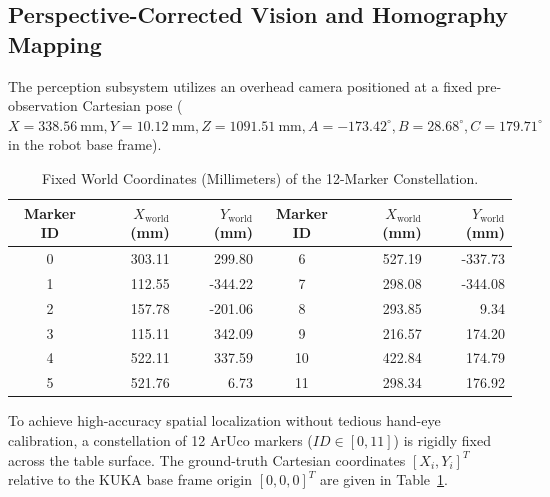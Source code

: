 \documentclass[runningheads]{llncs}
\begin{document}
\subsection{Perspective-Corrected Vision and Homography Mapping}
The perception subsystem utilizes an overhead camera positioned at a fixed pre-observation Cartesian pose ($X = \SI{338.56}{\milli\meter}, Y = \SI{10.12}{\milli\meter}, Z = \SI{1091.51}{\milli\meter}, A = -173.42^\circ, B = 28.68^\circ, C = 179.71^\circ$ in the robot base frame). 

\begin{table}[tb]
\caption{Fixed World Coordinates (Millimeters) of the 12-Marker Constellation.}
\label{tab:aruco_coords}
\centering
\begin{tabular}{crr|crr}
\toprule
\textbf{Marker ID} & \textbf{$X_{\text{world}}$ (mm)} & \textbf{$Y_{\text{world}}$ (mm)} & \textbf{Marker ID} & \textbf{$X_{\text{world}}$ (mm)} & \textbf{$Y_{\text{world}}$ (mm)} \\
\midrule
0  & 303.11 &  299.80 & 6  & 527.19 & -337.73 \\
1  & 112.55 & -344.22 & 7  & 298.08 & -344.08 \\
2  & 157.78 & -201.06 & 8  & 293.85 &    9.34 \\
3  & 115.11 &  342.09 & 9  & 216.57 &  174.20 \\
4  & 522.11 &  337.59 & 10 & 422.84 &  174.79 \\
5  & 521.76 &    6.73 & 11 & 298.34 &  176.92 \\
\bottomrule
\end{tabular}
\end{table}

To achieve high-accuracy spatial localization without tedious hand-eye calibration, a constellation of 12 ArUco markers ($ID \in [0, 11]$) is rigidly fixed across the table surface. The ground-truth Cartesian coordinates $[X_i, Y_i]^T$ relative to the KUKA base frame origin $[0,0,0]^T$ are given in Table~\ref{tab:aruco_coords}.
\end{document}
